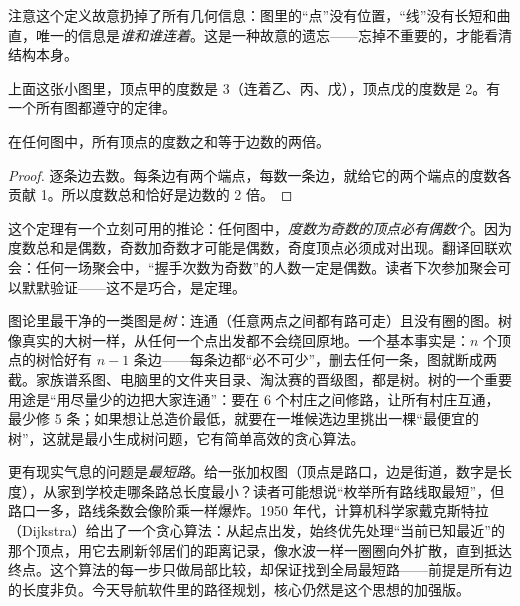 注意这个定义故意扔掉了所有几何信息：图里的“点”没有位置，“线”没有长短和曲直，唯一的信息是\emph{谁和谁连着}。这是一种故意的遗忘——忘掉不重要的，才能看清结构本身。

\begin{center}
\end{center}

上面这张小图里，顶点甲的度数是 3（连着乙、丙、戊），顶点戊的度数是 2。有一个所有图都遵守的定律。

\begin{dingli}[握手引理]
在任何图中，所有顶点的度数之和等于边数的两倍。
\end{dingli}

\begin{proof}
逐条边去数。每条边有两个端点，每数一条边，就给它的两个端点的度数各贡献 1。所以度数总和恰好是边数的 2 倍。
\end{proof}

这个定理有一个立刻可用的推论：任何图中，\emph{度数为奇数的顶点必有偶数个}。因为度数总和是偶数，奇数加奇数才可能是偶数，奇度顶点必须成对出现。翻译回联欢会：任何一场聚会中，“握手次数为奇数”的人数一定是偶数。读者下次参加聚会可以默默验证——这不是巧合，是定理。

图论里最干净的一类图是\emph{树}：连通（任意两点之间都有路可走）且没有圈的图。树像真实的大树一样，从任何一个点出发都不会绕回原地。一个基本事实是：$n$ 个顶点的树恰好有 $n-1$ 条边——每条边都“必不可少”，删去任何一条，图就断成两截。家族谱系图、电脑里的文件夹目录、淘汰赛的晋级图，都是树。树的一个重要用途是“用尽量少的边把大家连通”：要在 6 个村庄之间修路，让所有村庄互通，最少修 5 条；如果想让总造价最低，就要在一堆候选边里挑出一棵“最便宜的树”，这就是最小生成树问题，它有简单高效的贪心算法。

更有现实气息的问题是\emph{最短路}。给一张加权图（顶点是路口，边是街道，数字是长度），从家到学校走哪条路总长度最小？读者可能想说“枚举所有路线取最短”，但路口一多，路线条数会像阶乘一样爆炸。1950 年代，计算机科学家戴克斯特拉（Dijkstra）给出了一个贪心算法：从起点出发，始终优先处理“当前已知最近”的那个顶点，用它去刷新邻居们的距离记录，像水波一样一圈圈向外扩散，直到抵达终点。这个算法的每一步只做局部比较，却保证找到全局最短路——前提是所有边的长度非负。今天导航软件里的路径规划，核心仍然是这个思想的加强版。

